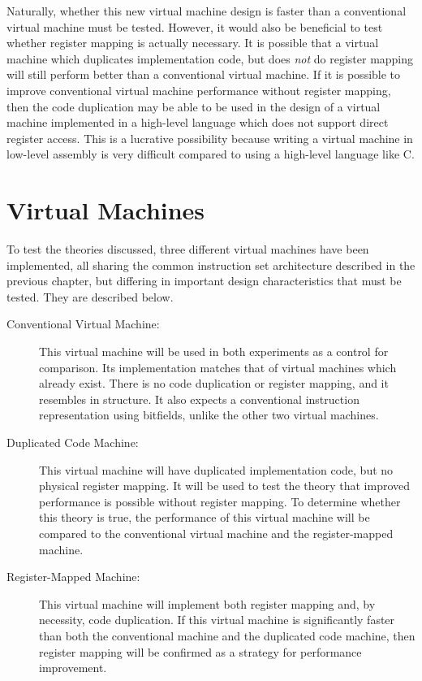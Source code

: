 	Naturally, whether this new virtual machine design is faster than a conventional virtual machine must be tested. However, it would also be beneficial to test whether register mapping is actually necessary. It is possible that a virtual machine which duplicates implementation code, but does \emph{not} do register mapping will still perform better than a conventional virtual machine. If it is possible to improve conventional virtual machine performance without register mapping, then the code duplication may be able to be used in the design of a virtual machine implemented in a high-level language which does not support direct register access. This is a lucrative possibility because writing a virtual machine in low-level assembly is very difficult compared to using a high-level language like C.
	
	\section{Virtual Machines}
	To test the theories discussed, three different virtual machines have been implemented, all sharing the common instruction set architecture described in the previous chapter, but differing in important design characteristics that must be tested. They are described below.
	
	\begin{description}
		\item[Conventional Virtual Machine:] This virtual machine will be used in both experiments as a control for comparison. Its implementation matches that of virtual machines which already exist. There is no code duplication or register mapping, and it resembles  in structure. It also expects a conventional instruction representation using bitfields, unlike the other two virtual machines.
		\item[Duplicated Code Machine:] This virtual machine will have duplicated implementation code, but no physical register mapping. It will be used to test the theory that improved performance is possible without register mapping. To determine whether this theory is true, the performance of this virtual machine will be compared to the conventional virtual machine and the register-mapped machine.
		\item[Register-Mapped Machine:] This virtual machine will implement both register mapping and, by necessity,  code duplication. If this virtual machine is significantly faster than both the conventional machine and the duplicated code machine, then register mapping will be confirmed as a strategy for performance improvement.
	\end{description}
	

